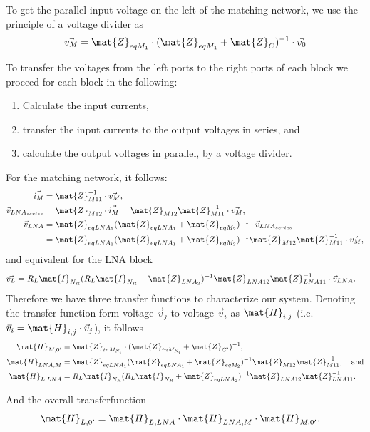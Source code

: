 To get the parallel input voltage on the left of the matching network, we use the principle of a voltage divider as
\begin{equation}
\vec{v_M} = \mat{Z}_{eqM_1}\cdot(\mat{Z}_{eqM_1} + \mat{Z}_{C})^{-1} \cdot \vec{v_0}
\end{equation}

To transfer the voltages from the left ports to the right ports of each block we proceed for each block in the following: 
\begin{enumerate}
\item{Calculate the input currents,}
\item{transfer the input currents to the output voltages in series, and}
\item{calculate the output voltages in parallel, by a voltage divider.}
\end{enumerate}
For the matching network, it follows:
\begin{align}
\vec{i_M} &= \mat{Z}_{M11}^{-1}\cdot\vec{v_M},\\
\vec{v}_{LNA_{series}} &= \mat{Z}_{M12}\cdot\vec{i_M} = \mat{Z}_{M12} \mat{Z}_{M11}^{-1}\cdot\vec{v_M},\\
\vec{v}_{LNA} &= \mat{Z}_{eqLNA_1}(\mat{Z}_{eqLNA_1}+\mat{Z}_{eqM_2})^{-1}\cdot\vec{v}_{LNA_{series}}\\\nonumber
&=\mat{Z}_{eqLNA_1}(\mat{Z}_{eqLNA_1}+\mat{Z}_{eqM_2})^{-1}\mat{Z}_{M12} \mat{Z}_{M11}^{-1}\cdot\vec{v_M},
\end{align}
and equivalent for the LNA block
\begin{align}
\vec{v_{L}}&=R_L\mat{I}_{N_R}(R_L\mat{I}_{N_R}+\mat{Z}_{LNA_2})^{-1}\mat{Z}_{LNA12}\mat{Z}_{LNA11}^{-1}\cdot\vec{v}_{LNA}.
\end{align}
Therefore we have three transfer functions to characterize our system.
Denoting the transfer function form voltage $\vec{v}_j$ to voltage $\vec{v}_i$ as $\mat{H}_{i,j}$ (i.e. $\vec{v}_i = \mat{H}_{i,j} \cdot\vec{v}_j$), it follows
\begin{align}
\mat{H}_{M,0'} &= \mat{Z}_{inM_{N_i}}\cdot(\mat{Z}_{inM_{N_i}} + \mat{Z}_{C'})^{-1}, \\
\mat{H}_{LNA,M} &= \mat{Z}_{eqLNA_1}(\mat{Z}_{eqLNA_1}+\mat{Z}_{eqM_2})^{-1}\mat{Z}_{M12} \mat{Z}_{M11}^{-1},\quad\text{and}\\
\mat{H}_{L,LNA} &= R_L\mat{I}_{N_R}(R_L\mat{I}_{N_R}+\mat{Z}_{eqLNA_2})^{-1}\mat{Z}_{LNA12}\mat{Z}_{LNA11}^{-1}.
\end{align}

And the overall transferfunction
\begin{align}
\mat{H}_{L,0'} &= \mat{H}_{L,LNA}\cdot\mat{H}_{LNA,M}\cdot\mat{H}_{M,0'}.
\end{align}



